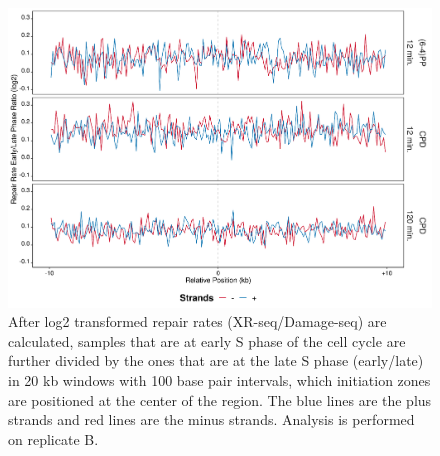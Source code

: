 \begin{figure}[H]
\begin{center}
\includegraphics[width=\textwidth]{Chapters/7_appendix/figures/supfig39}
\caption[Repair rate early/late ratio of initiation zones in 20 kb (replicate B).]{After log2 transformed repair rates (XR-seq/Damage-seq) are calculated, samples that are at early S phase of the cell cycle are further divided by the ones that are at the late S phase (early/late) in 20 kb windows with 100 base pair intervals, which initiation zones are positioned at the center of the region. The blue lines are the plus strands and red lines are the minus strands. Analysis is performed on replicate B.}
\label{supfig:rrel20inzonesB}
\end{center}
\end{figure}

